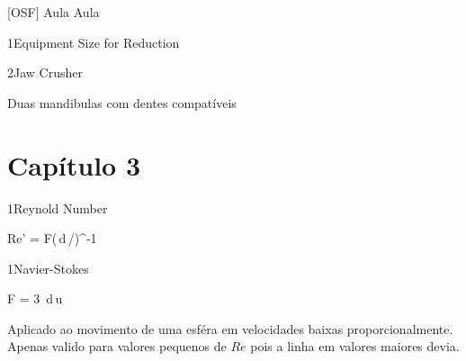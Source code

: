 \documentclass[\mainfilename]{subfiles}
\begin{document}
[OSF]
{Aula}
{Aula}

\begin{sectionBox}1{Equipment Size for Reduction}
    
    
    
\end{sectionBox}

\begin{sectionBox}2{Jaw Crusher}
    
    Duas mandibulas com dentes compatíveis
    
\end{sectionBox}

\part*{Capítulo 3}

\begin{definitionBox}1{Reynold Number}
    
    \begin{BM}
        Re' = F(\pi\,d\,\rho/\mu)^{-1}
    \end{BM}
    
\end{definitionBox}

\begin{definitionBox}1{Navier-Stokes}
    
    \begin{BM}
        F = 3\,\pi\,\mu\,d\,u
    \end{BM}

    Aplicado ao movimento de uma esféra em velocidades baixas proporcionalmente.
    Apenas valido para valores pequenos de \(Re\) pois a linha em valores maiores devia.
    
\end{definitionBox}
\end{document}
